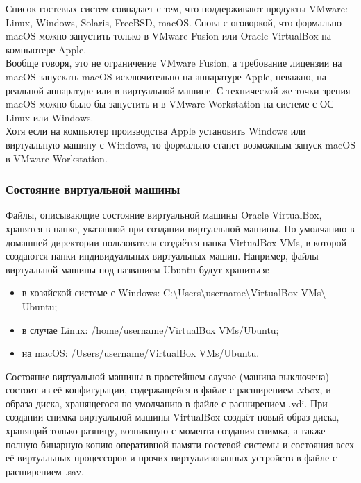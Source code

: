 \documentclass[14pt, a4paper]{article}
\begin{document}
Список гостевых систем совпадает с тем, что поддерживают продукты VMware: Linux, Windows,
Solaris, FreeBSD, macOS. Снова с оговоркой, что формально macOS можно запустить только в
VMware Fusion или Oracle VirtualBox на компьютере Apple.\\

Вообще говоря, это не ограничение VMware Fusion, а требование лицензии на macOS запускать
macOS исключительно на аппаратуре Apple, неважно, на реальной аппаратуре или в виртуальной
машине. С технической же точки зрения macOS можно было бы запустить и в VMware Workstation на
системе с ОС Linux или Windows.\\

Хотя если на компьютер производства Apple установить Windows или виртуальную машину с
Windows, то формально станет возможным запуск macOS в VMware Workstation.

\subsubsection*{Состояние виртуальной машины} 

Файлы, описывающие состояние виртуальной машины Oracle VirtualBox, хранятся в папке, указанной
при создании виртуальной машины. По умолчанию в домашней директории пользователя создаётся
папка VirtualBox VMs, в которой создаются папки индивидуальных виртуальных машин. Например,
файлы виртуальной машины под названием Ubuntu будут храниться:

\begin{itemize}
    \item в хозяйской системе с Windows: C:\textbackslash Users\textbackslash username\textbackslash VirtualBox VMs\textbackslash \\Ubuntu;
    \item в случае Linux: /home/username/VirtualBox VMs/Ubuntu;
    \item на macOS: /Users/username/VirtualBox VMs/Ubuntu.
\end{itemize}

Состояние виртуальной машины в простейшем случае (машина выключена) состоит из её
конфигурации, содержащейся в файле с расширением .vbox, и образа диска, хранящегося по
умолчанию в файле с расширением .vdi. При создании снимка виртуальной машины VirtualBox
создаёт новый образ диска, хранящий только разницу, возникшую с момента создания снимка, а
также полную бинарную копию оперативной памяти гостевой системы и состояния всех её
виртуальных процессоров и прочих виртуализованных устройств в файле с расширением .sav.\\
\end{document}
